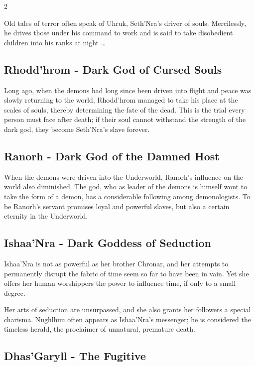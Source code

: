 \begin{multicols}{2}
{Old tales of terror often speak of Uhruk, Seth'Nra's driver of souls. Mercilessly, he drives those under his command to work and is said to take disobedient children into his ranks at night \ldots{}

\subsection{Rhodd'hrom - Dark God of Cursed Souls}\label{subsec:rhodd'hrom-dunkler-gott-der-verfluchten-seelen}

Long ago, when the demons had long since been driven into flight and peace was slowly returning to the world, Rhodd'hrom managed to take his place at the scales of souls, thereby determining the fate of the dead. This is the trial every person must face after death; if their soul cannot withstand the strength of the dark god, they become Seth'Nra's slave forever.

\subsection{Ranorh - Dark God of the Damned Host}\label{subsec:ranorh-dunkler-gott-des-verdammten-heeres}

When the demons were driven into the Underworld, Ranorh's influence on the world also diminished. The god, who as leader of the demons is himself wont to take the form of a demon, has a considerable following among demonologists. To be Ranorh's servant promises loyal and powerful slaves, but also a certain eternity in the Underworld.

\subsection{Ishaa'Nra - Dark Goddess of Seduction}\label{subsec:ishaa'nra-dunkle-gottin-der-verfuhrung}

Ishaa'Nra is not as powerful as her brother Chronar, and her attempts to permanently disrupt the fabric of time seem so far to have been in vain. Yet she offers her human worshippers the power to influence time, if only to a small degree.

Her arts of seduction are unsurpassed, and she also grants her followers a special charisma. Nughlhuu often appears as Ishaa'Nra's messenger; he is considered the timeless herald, the proclaimer of unnatural, premature death.

\subsection{Dhas'Garyll - The Fugitive}\label{subsec:dhasgaryll-der-geflohene}

}
\end{multicols}
